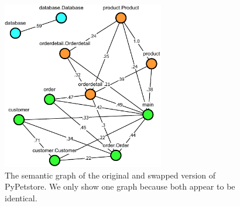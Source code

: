 \begin{figure}
    \caption[The semantic graph of PyPetstore before and after swapping content.]{The semantic graph of the original and swapped version of PyPetstore. We only show one graph because both appear to be identical.}
    \label{fig:pypestore_semantic_before_after}
    \begin{adjustbox}{center}
    \includegraphics[width=200pt]{figures/data/pypetstore_semantic_original.pdf}
    \end{adjustbox}
\end{figure}